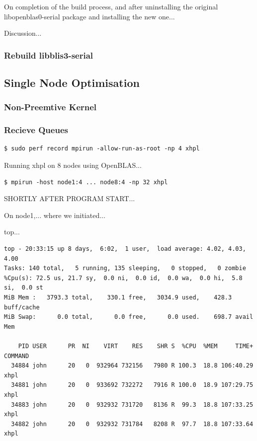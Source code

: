 \documentclass{article}
\begin{document}
On completion of the build process, and after uninstalling the original libopenblas0-serial package and installing the new one...


Discussion...


\subsubsection{Rebuild libblis3-serial}



%
%
\subsection{Single Node Optimisation}

\subsubsection{Non-Preemtive Kernel}

\subsubsection{Recieve Queues}

\lstset{style=termstyle}
\begin{lstlisting}
$ sudo perf record mpirun -allow-run-as-root -np 4 xhpl
\end{lstlisting}



Running xhpl on 8 nodes using OpenBLAS...

\lstset{style=termstyle}
\begin{lstlisting}
$ mpirun -host node1:4 ... node8:4 -np 32 xhpl
\end{lstlisting}


SHORTLY AFTER PROGRAM START...

On node1,... where we initiated...

top...

\lstset{style=termstyle}
\begin{lstlisting}
top - 20:33:15 up 8 days,  6:02,  1 user,  load average: 4.02, 4.03, 4.00
Tasks: 140 total,   5 running, 135 sleeping,   0 stopped,   0 zombie
%Cpu(s): 72.5 us, 21.7 sy,  0.0 ni,  0.0 id,  0.0 wa,  0.0 hi,  5.8 si,  0.0 st
MiB Mem :   3793.3 total,    330.1 free,   3034.9 used,    428.3 buff/cache
MiB Swap:      0.0 total,      0.0 free,      0.0 used.    698.7 avail Mem 

    PID USER      PR  NI    VIRT    RES    SHR S  %CPU  %MEM     TIME+ COMMAND                                                   
  34884 john      20   0  932964 732156   7980 R 100.3  18.8 106:40.29 xhpl                                                      
  34881 john      20   0  933692 732272   7916 R 100.0  18.9 107:29.75 xhpl                                                      
  34883 john      20   0  932932 731720   8136 R  99.3  18.8 107:33.25 xhpl                                                      
  34882 john      20   0  932932 731784   8208 R  97.7  18.8 107:33.64 xhpl                                                      
\end{lstlisting}
\end{document}
